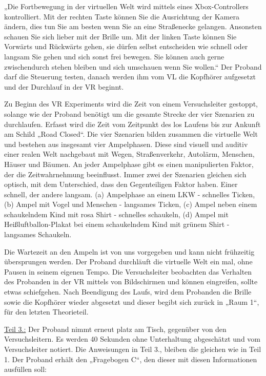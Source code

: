 \documentclass{Bericht}
\begin{document}
„Die Fortbewegung in der virtuellen Welt wird mittels eines Xbox-Controllers kontrolliert. Mit
der rechten Taste können Sie die Ausrichtung der Kamera ändern, dies tun Sie am besten
wenn Sie an eine Straßenecke gelangen. Ansonsten schauen Sie sich lieber mit der Brille um.
Mit der linken Taste können Sie Vorwärts und Rückwärts gehen, sie dürfen selbst entscheiden
wie schnell oder langsam Sie gehen und sich sonst frei bewegen. Sie können auch gerne zwischendurch
stehen bleiben und sich umschauen wenn Sie wollen.“ Der Proband darf die Steuerung
testen, danach werden ihm vom VL die Kopfhörer aufgesetzt und der Durchlauf in der VR
beginnt.
\par
Zu Beginn des VR Experiments wird die Zeit von einem Versuchsleiter gestoppt, solange wie
der Proband benötigt um die gesamte Strecke der vier Szenarien zu durchlaufen. Erfasst wird
die Zeit vom Zeitpunkt des los Laufens bis zur Ankunft am Schild „Road Closed“. Die vier Szenarien
bilden zusammen die virtuelle Welt und bestehen aus insgesamt vier Ampelphasen. Diese
sind visuell und auditiv einer realen Welt nachgebaut mit Wegen, Straßenverkehr, Autolärm,
Menschen, Häuser und Bäumen. An jeder Ampelphase gibt es einen manipulierten Faktor, der
die Zeitwahrnehmung beeinflusst. Immer zwei der Szenarien gleichen sich optisch, mit dem
Unterschied, dass den Gegenteiligen Faktor haben. Einer schnell, der andere langsam. (a) Ampelphase
an einem LKW - schnelles Ticken, (b) Ampel mit Vogel und Menschen - langsames
Ticken, (c) Ampel neben einem schaukelndem Kind mit rosa Shirt - schnelles schaukeln, (d)
Ampel mit Heißluftballon-Plakat bei einem schaukelndem Kind mit grünem Shirt - langsames
Schaukeln.
\par
Die Wartezeit an den Ampeln ist von uns vorgegeben und kann nicht frühzeitig übersprungen
werden. Der Proband durchläuft die virtuelle Welt ein mal, ohne Pausen in seinem eigenen
Tempo. Die Versuchsleiter beobachten das Verhalten des Probanden in der VR mittels von Bildschirmen
und können eingreifen, sollte etwas schiefgehen. Nach Beendigung des Laufs, wird
dem Probanden die Brille sowie die Kopfhörer wieder abgesetzt und dieser begibt sich zurück in
„Raum 1“, für den letzten Theorieteil.
\par
\underline{Teil 3.:}
Der Proband nimmt erneut platz am Tisch, gegenüber von den Versuchsleitern.
Es werden 40 Sekunden ohne Unterhaltung abgeschätzt und vom Versuchsleiter notiert. Die
Anweisungen in Teil 3., bleiben die gleichen wie in Teil 1.
Der Proband erhält den „Fragebogen C“, den dieser mit diesen Informationen ausfüllen soll:
\end{document}
